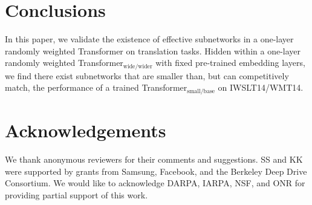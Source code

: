 \section{Conclusions}
\label{sec:conclusions}
In this paper, we validate the existence of effective subnetworks in a one-layer randomly weighted Transformer on translation tasks. 
Hidden within a one-layer randomly weighted Transformer$_\text{wide/wider}$ with fixed pre-trained embedding layers, we find there exist subnetworks that are smaller than, but can competitively match, the performance of a trained Transformer$_\text{small/base}$ on IWSLT14/WMT14. 



\section*{Acknowledgements}
We thank anonymous reviewers for their comments and suggestions. SS and KK were supported by grants from Samsung, Facebook, and the Berkeley Deep Drive Consortium. We would like to acknowledge DARPA, IARPA, NSF, and ONR for providing partial support of this work.